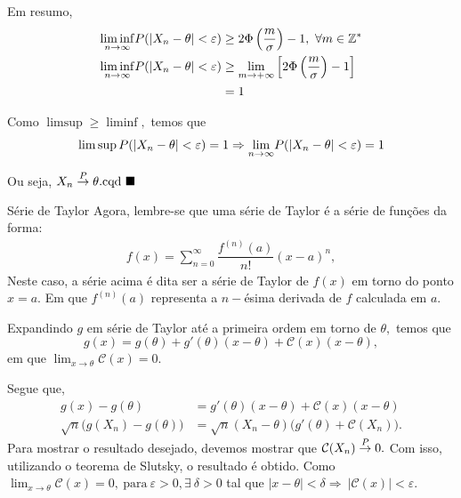 \documentclass[12pt]{beamer}
\begin{document}
\begin{frame}{}
\begin{block}{}
\justifying
Em resumo,
\begin{align*}
    {\displaystyle \liminf_{n\to\infty}} P(|X_{n}-\theta|<\varepsilon)&\geq 2\Phi\left(\frac{m}{\sigma}\right)-1,~\forall m\in \mathbb{Z}^{*}\\  
    {\displaystyle \liminf_{n\to\infty}} P(|X_{n}-\theta|<\varepsilon)&\geq \lim_{m\rightarrow +\infty} \Big[2\Phi\left(\frac{m}{\sigma}\right)-1\Big]\\
    &=1
\end{align*}
\end{block}
\pause
\begin{block}{}
\justifying
Como $\limsup\geq \liminf,$ temos que
\begin{align}\label{num1}
    \limsup P(|X_{n}-\theta|<\varepsilon)=1\Rightarrow {\displaystyle \lim_{n\to\infty}} P(|X_{n}-\theta|<\varepsilon)=1
\end{align}
\end{block}
\pause
\begin{block}{}
\justifying
Ou seja, $X_{n}\overset{P}{\rightarrow} \theta. \text{cqd}~\blacksquare$
\end{block}
\end{frame}

\begin{frame}{}
	\begin{block}{Série de Taylor}
		\justifying
		Agora, lembre-se que uma série de Taylor é a série de funções da forma:
		\begin{align*}
			f(x)=\displaystyle{\sum_{n=0}^{\infty}\dfrac{f^{(n)}(a)}{n!}}(x-a)^{n},
		\end{align*}
Neste caso, a série acima é dita ser a série de Taylor de $f(x)$ em torno do ponto $x=a$. Em que $f^{(n)}(a)$ representa a $n-$ésima derivada de $f$ calculada em $a.$
	\end{block}
	\pause
	\begin{block}{}
		\justifying
		Expandindo $g$ em série de Taylor até a primeira ordem em torno de $\theta,$ temos que $$g(x)=g(\theta)+g'(\theta)(x-\theta)+\mathcal{C}(x)(x-\theta),$$ em que ${\displaystyle \lim_{x\rightarrow \theta} \mathcal{C}(x)=0}.$
	\end{block}
\end{frame}

\begin{frame}{}
\begin{block}{}
\justifying
Segue que, 
\begin{align*}
g(x)-g(\theta)&=g'(\theta)(x-\theta)+\mathcal{C}(x)(x-\theta)\\
\sqrt{n}\big(g(X_{n})-g(\theta)\big)&=\sqrt{n}(X_{n}-\theta)\big(g'(\theta)+\mathcal{C}(X_{n})\big).
\end{align*}
Para mostrar o resultado desejado, devemos mostrar que $\mathcal{C}(X_{n})\overset{P}{\rightarrow} 0.$ Com isso, utilizando o teorema de Slutsky, o resultado é obtido. Como ${\displaystyle \lim_{x\rightarrow \theta} \mathcal{C}(x)=0},~\text{para}~\varepsilon>0, \exists~\delta>0$ tal que $|x-\theta|<\delta\Rightarrow~|\mathcal{C}(x)|<\varepsilon.$
\end{block}
\end{frame}
\end{document}
